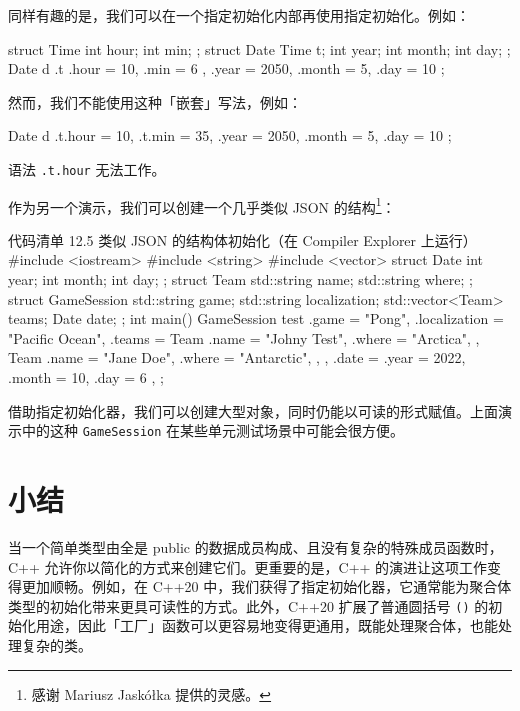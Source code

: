 同样有趣的是，我们可以在一个指定初始化内部再使用指定初始化。例如：

\begin{codebox}[cpp]
struct Time { int hour; int min; };
struct Date { Time t; int year; int month; int day; };
Date d { .t { .hour = 10, .min = 6 }, .year = 2050, .month = 5, .day = 10 };
\end{codebox}

然而，我们不能使用这种「嵌套」写法，例如：

\begin{codebox}[cpp]
Date d { .t.hour = 10, .t.min = 35, .year = 2050, .month = 5, .day = 10 };
\end{codebox}

语法 \texttt{.t.hour} 无法工作。

作为另一个演示，我们可以创建一个几乎类似 JSON 的结构\footnote{感谢 Mariusz Jaskółka 提供的灵感。}：

\begin{codeboxt}[cpp]{代码清单 12.5 类似 JSON 的结构体初始化（在 Compiler Explorer 上运行）}
#include <iostream>
#include <string>
#include <vector>
struct Date { int year; int month; int day; };
struct Team { std::string name; std::string where; };
struct GameSession {
std::string game;
std::string localization;
std::vector<Team> teams;
Date date;
};
int main() {
GameSession test {
.game = "Pong",
.localization = "Pacific Ocean",
.teams
= {
Team {
.name = "Johny Test",
.where = "Arctica",
},
Team {
.name = "Jane Doe",
.where = "Antarctic",
},
},
.date = {
.year = 2022,
.month = 10,
.day = 6
},
};
}
\end{codeboxt}

借助指定初始化器，我们可以创建大型对象，同时仍能以可读的形式赋值。上面演示中的这种 \texttt{GameSession} 在某些单元测试场景中可能会很方便。

\section{小结}

当一个简单类型由全是 public 的数据成员构成、且没有复杂的特殊成员函数时，C++ 允许你以简化的方式来创建它们。更重要的是，C++ 的演进让这项工作变得更加顺畅。例如，在 C++20 中，我们获得了指定初始化器，它通常能为聚合体类型的初始化带来更具可读性的方式。此外，C++20 扩展了普通圆括号 \texttt{()} 的初始化用途，因此「工厂」函数可以更容易地变得更通用，既能处理聚合体，也能处理复杂的类。
